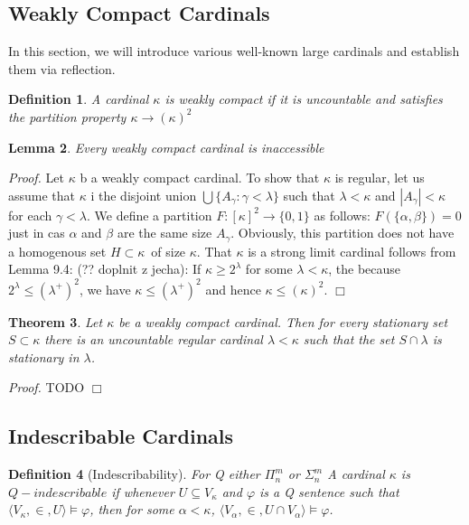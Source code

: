\documentclass[12pt,a4paper]{article}
\newtheorem{theorem}{Theorem}[section]
\newtheorem{definition}[theorem]{Definition}
\newtheorem{lemma}[theorem]{Lemma}
\newenvironment{proof}
{\noindent \textit{Proof.}}
{\hspace*{\fill} $\Box$}
\newcommand{\then}{\rightarrow}
\begin{document}
\subsection{Weakly Compact Cardinals}
In this section, we will introduce various well-known large cardinals and establish them via reflection.
\begin{definition}
A cardinal $\kappa$ is \emph{weakly compact} if it is uncountable and satisfies the partition property $\kappa \then (\kappa)^2$
\end{definition}

\begin{lemma}
Every weakly compact cardinal is inaccessible
\end{lemma}

\begin{proof}
Let $\kappa$ b a weakly compact cardinal. To show that $\kappa$ is regular, let us assume that $\kappa$ i the disjoint union
$\bigcup\{A_{\gamma}: \gamma < \lambda\}$ such that $\lambda < \kappa$ and $|A_{\gamma}| < \kappa$ for each $\gamma < \lambda$.
 We define a partition $F: [\kappa]^2 \then \{0, 1\}$ as follows: $F(\{\alpha, \beta\}) = 0$ just in cas $\alpha$ and $\beta$ are the same size $A_{\gamma}$. Obviously, this partition does not have a homogenous set $H \subset \kappa$ of size $\kappa$.
That $\kappa$ is a strong limit cardinal follows from Lemma 9.4: (?? doplnit z jecha): If $\kappa \geq 2^{\lambda}$ for some $\lambda < \kappa$,
the because $2^{\lambda} \leq (\lambda^{+})^2$, we have $\kappa \leq (\lambda^{+})^2$ and hence $\kappa \leq (\kappa)^2$.
\end{proof}

\begin{theorem}\label{th:refl_weakly_compact}
Let $\kappa$ be a weakly compact cardinal. Then for every stationary set $S \subset \kappa$ there is an uncountable regular cardinal $\lambda < \kappa$ such that the set $S \cap \lambda$ is stationary in $\lambda$.
\end{theorem}
\begin{proof}
TODO
\end{proof}

\subsection{Indescribable Cardinals}
\begin{definition}[Indescribability]
For Q either $\Pi^m_n$ or $\Sigma^m_n$\newline
A cardinal $\kappa$ is \emph{$Q-indescribable$} if whenever
$U \subseteq V_\kappa$ and $\varphi$ is a Q sentence such that $\langle V_\kappa, \in, U \rangle \models \varphi$, then for some $\alpha < \kappa$, $\langle V_\alpha, \in, U \cap V_\alpha \rangle \models \varphi$.
\end{definition}
\end{document}
